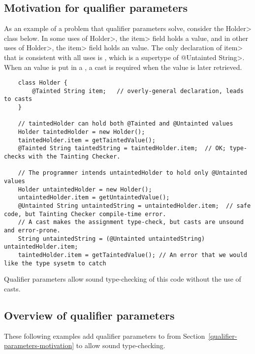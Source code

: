 \subsection{Motivation for qualifier parameters\label{qualifier-parameters-motivation}}

As an example of a problem that qualifier parameters solve, consider
the \<Holder> class below.  In some uses of \<Holder>, the \<item> field
holds a  value, and in other uses of \<Holder>, the \<item>
field holds an  value.  The only declaration of \<item>
that is consistent with all uses is , which is a supertype
of \<@Untainted String>.  When an  value is put in a ,
a cast is required when the value is later retrieved.

\begin{mysmall}
\begin{Verbatim}
    class Holder {
        @Tainted String item;   // overly-general declaration, leads to casts
    }

    // taintedHolder can hold both @Tainted and @Untainted values
    Holder taintedHolder = new Holder();
    taintedHolder.item = getTaintedValue();
    @Tainted String taintedString = taintedHolder.item;  // OK; type-checks with the Tainting Checker.

    // The programmer intends untaintedHolder to hold only @Untainted values
    Holder untaintedHolder = new Holder();
    untaintedHolder.item = getUntaintedValue();
    @Untainted String untaintedString = untaintedHolder.item;  // safe code, but Tainting Checker compile-time error.
    // A cast makes the assignment type-check, but casts are unsound and error-prone.
    String untaintedString = (@Untainted untaintedString) untaintedHolder.item;
    taintedHolder.item = getTaintedValue(); // An error that we would like the type sysetm to catch
\end{Verbatim}
\end{mysmall}

Qualifier parameters allow sound type-checking of this
code without the use of casts.


\subsection{Overview of qualifier parameters\label{qualifier-parameters-overview}}

These following examples add qualifier parameters to
 from Section~\ref{qualifier-parameters-motivation} to allow
sound type-checking.

